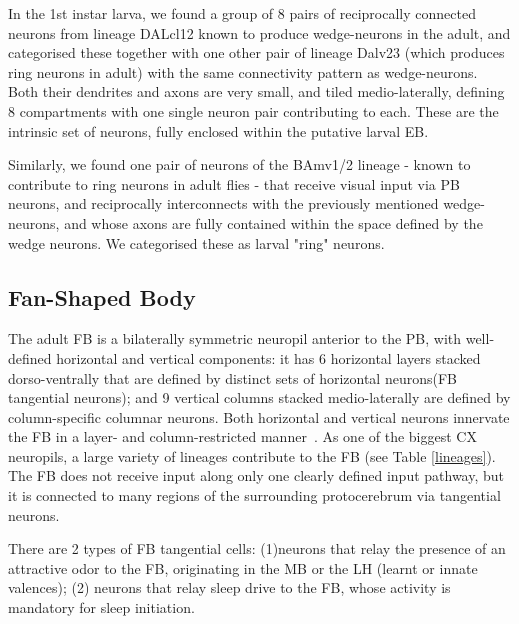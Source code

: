 In the 1st instar larva, we found a group of 8 pairs of reciprocally connected neurons from lineage DALcl12 known to produce wedge-neurons in the adult, and categorised these together with one other pair of lineage Dalv23 (which produces ring neurons in adult) with the same connectivity pattern as wedge-neurons. Both their dendrites and axons are very small, and tiled medio-laterally, defining 8 compartments with one single neuron pair contributing to each. These are the intrinsic set of neurons, fully enclosed within the putative larval EB. 

Similarly, we found one pair of neurons of the BAmv1/2 lineage - known to contribute to ring neurons in adult flies - that receive visual input via PB neurons, and reciprocally interconnects with the previously mentioned wedge-neurons, and whose axons are fully contained within the space defined by the wedge neurons. We categorised these as larval "ring" neurons.




\subsection*{Fan-Shaped Body}


The adult FB is a bilaterally symmetric neuropil anterior to the PB, with well-defined horizontal and vertical components: it has 6 horizontal layers stacked dorso-ventrally that are defined by distinct sets of horizontal neurons(FB tangential neurons); and 9 vertical columns stacked medio-laterally are defined by column-specific columnar neurons. Both horizontal and vertical neurons innervate the FB in a layer- and column-restricted manner~\citep{heinze2017unraveling}. As one of the biggest CX neuropils, a large variety of lineages contribute to the FB (see Table \ref{lineages}).
The FB does not receive input along only one clearly defined input pathway, but it is connected to many regions of the surrounding protocerebrum via tangential neurons. 

There are 2 types of FB tangential cells: (1)neurons that relay the presence of an attractive odor to the FB, originating in the MB or the LH (learnt or innate valences); (2) neurons that relay sleep drive to the FB, whose activity is mandatory for sleep initiation. 


